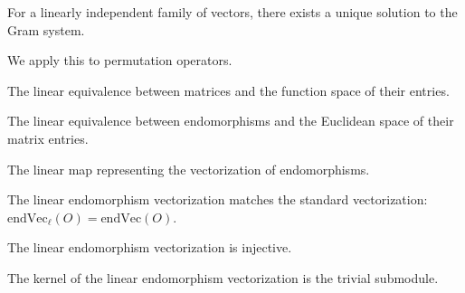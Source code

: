 \begin{theorem}\label{thm:gram_system_unique}
  \leanok
  For a linearly independent family of vectors, there exists a unique solution to the Gram system.
\end{theorem}

We apply this to permutation operators.

\begin{definition}\label{def:matrixEntriesEquiv}
  \leanok
  The linear equivalence between matrices and the function space of their entries.
\end{definition}

\begin{definition}\label{def:endVecEquiv}
  \leanok
  The linear equivalence between endomorphisms and the Euclidean space of their matrix entries.
\end{definition}

\begin{definition}\label{def:endVecₗ}
  \leanok
  The linear map representing the vectorization of endomorphisms.
\end{definition}

\begin{theorem}\label{thm:endVecₗ_apply}
  \leanok
  The linear endomorphism vectorization matches the standard vectorization: $\text{endVec}_\ell(O) = \text{endVec}(O)$.
\end{theorem}

\begin{theorem}\label{thm:endVecₗ_injective}
  \leanok
  The linear endomorphism vectorization is injective.
\end{theorem}

\begin{theorem}\label{thm:endVecₗ_ker}
  \leanok
  The kernel of the linear endomorphism vectorization is the trivial submodule.
\end{theorem}

